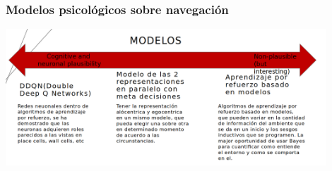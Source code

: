 \begin{frame}\frametitle{Modelos psicológicos sobre navegación}
  \includegraphics[width=0.9\textwidth]{Figures/FPNavigation1.png}
\end{frame}

